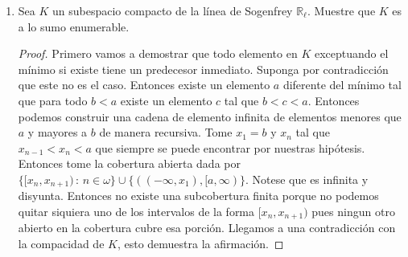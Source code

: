 \documentclass[letter,twoside,12pt]{article}
\newtheorem{lemma}[theo]{Lema}
\begin{document}
\begin{enumerate}
\begin{proof}
		Ahora para demostrar que es continua primero demostramos el siguiente Lema
		
		\begin{lemma}
			Sea $ \mathcal{U} $ un ultrafiltro y $ \{x_n\} $ una sucesión en $ X $. Si $U$ es un abierto en $ X $ tal que $ N_U=\{n \in \mathbb{N}\,:\, x_n \in U \} \in \mathcal{U} $ entonces $ x = \lim_{n \to \mathcal{U}} x_n \in \overline{U} $.
			
			\begin{proof}
				Suponga por contradicción que $ x \not \in \overline{U} $. Entonces existe un vecindario $ V $  de $ x $ tal que $ U \cap V  = \emptyset $. Pero por definición de convergencia $ N_V = \{ n \in \mathbb{N}\,:\, x_n \in V \} \in \mathcal{U} $. Pero $ N_U $ y $ N_V $ son disyuntos y como ambos pertenecen al ultrafiltro, el vacío también perteneceria al vacío lo cual es una contradicción.
			\end{proof}
			
		\end{lemma}
		
		Ahora para demostrar el enunciado tome un conjunto abierto $ U $ y veamos que $ f^{-1}(U) $ es abierta. Tome cualquier ultrafiltro $ \mathcal{U} \in f^{-1}(U) $. Sea $ x = \lim_{n \to \mathcal{U}}x_n $. Por el punto 2 existe un vecindario $ V $ de $x$ tal que $ \overline{V} \subseteq U $. Entonces si tomamos $ N_V=\{n \in \mathbb{N}\,:\, x_n \in V  \} $ el básico $ [N_V] $ es un vecindario de $ \mathcal{U} $ contenido en $ f^{-1}(U) $. 
		
		Claramente $ \mathcal{U} \in [N_V] $ porque $ V $ es un vecindario de $x$. Además si tomamos cualquier filtro $ \mathcal{U}' \in [N_V] $, por el lema tenemos que $ \lim_{n \to \mathcal{U}'}x_n \in \overline{V} \subseteq U $. Por lo tanto, $ [N_V] \in f^{-1}(U) $. 
		
	\end{proof}
	\item Sea $ K $ un subespacio compacto de la línea de Sogenfrey $ \mathbb{R}_{\ell} $. Muestre que $ K $ es a lo sumo enumerable.
	\begin{proof}
		Primero vamos a demostrar que todo elemento en $ K $ exceptuando el mínimo si existe tiene un predecesor inmediato. Suponga por contradicción que este no es el caso. Entonces existe un elemento $ a $ diferente del mínimo tal que para todo $ b < a $ existe un elemento $ c $ tal que $ b < c < a $. Entonces podemos construir una cadena de elemento infinita de elementos menores que $a$ y mayores a $b$ de manera recursiva. Tome $ x_1 = b $ y $ x_n $ tal que $ x_{n-1}<x_n< a $ que siempre se puede encontrar por nuestras hipótesis. Entonces tome la cobertura abierta dada por $ \{[x_n,x_{n+1}) \,:\, n \in \omega \} \cup \{((-\infty,x_1), [a,\infty)\} $. Notese que es infinita y disyunta. Entonces no existe una subcobertura finita porque no podemos quitar siquiera uno de los intervalos de la forma $ [x_n,x_{n+1}) $ pues ningun otro abierto en la cobertura cubre esa porción. Llegamos a una contradicción con la compacidad de $ K $, esto demuestra la afirmación.
		

\end{proof}
\end{enumerate}
\end{document}
